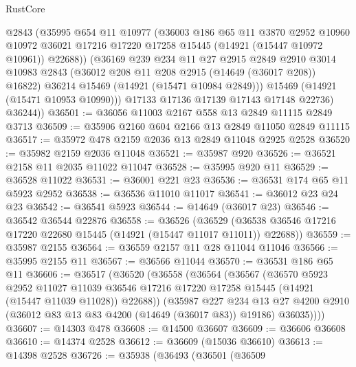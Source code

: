 \begin{lexlean}{RustCore}
\begin{coremodule}
            @2843
            (@35995
              @654
              @11
              @10977
              (@36003
                @186
                @65
                @11
                @3870
                @2952
                @10960
                @10972
                @36021
                @17216
                @17220
                @17258
                @15445
                (@14921 (@15447 @10972 @10961))
                @22688))
            (@36169
              @239
              @234
              @11
              @27
              @2915
              @2849
              @2910
              @3014
              @10983
              @2843
              (@36012 @208 @11 @208 @2915 (@14649 (@36017 @208)) @16822)
              @36214
              @15469
              (@14921 (@15471 @10984 @2849)))
            @15469
            (@14921 (@15471 @10953 @10990)))
          @17133
          @17136
          @17139
          @17143
          @17148
          @22736)
        @36244))
@36501 := @36056 @11003 @2167 @558 @13 @2849 @11115 @2849 @3713
@36509 := @35906 @2160 @604 @2166 @13 @2849 @11050 @2849 @11115
@36517 := @35972 @478 @2159 @2036 @13 @2849 @11048 @2925 @2528
@36520 := @35982 @2159 @2036 @11048
@36521 := @35987 @920
@36526 := @36521 @2158 @11 @2035 @11022 @11047
@36528 := @35995 @920 @11
@36529 := @36528 @11022
@36531 := @36001 @221 @23
@36536 := @36531 @174 @65 @11 @5923 @2952
@36538 := @36536 @11010 @11017
@36541 := @36012 @23 @24 @23
@36542 := @36541 @5923
@36544 := @14649 (@36017 @23)
@36546 := @36542 @36544 @22876
@36558 := @36526
    (@36529 (@36538 @36546 @17216 @17220 @22680 @15445 (@14921 (@15447 @11017 @11011)) @22688))
@36559 := @35987 @2155
@36564 := @36559 @2157 @11 @28 @11044 @11046
@36566 := @35995 @2155 @11
@36567 := @36566 @11044
@36570 := @36531 @186 @65 @11
@36606 := @36517
    (@36520
      (@36558
        (@36564
          (@36567
            (@36570
              @5923
              @2952
              @11027
              @11039
              @36546
              @17216
              @17220
              @17258
              @15445
              (@14921 (@15447 @11039 @11028))
              @22688))
          (@35987
            @227
            @234
            @13
            @27
            @4200
            @2910
            (@36012 @83 @13 @83 @4200 (@14649 (@36017 @83)) @19186)
            @36035))))
@36607 := @14303 @478
@36608 := @14500 @36607
@36609 := @36606 @36608
@36610 := @14374 @2528
@36612 := @36609 (@15036 @36610)
@36613 := @14398 @2528
@36726 := @35938
    (@36493
      (@36501
        (@36509

\end{coremodule}
\end{lexlean}
